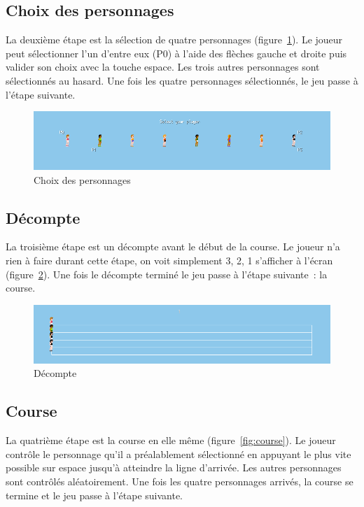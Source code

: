 \documentclass[a4paper]{article}
\begin{document}
\subsection{Choix des personnages}

La deuxième étape est la sélection de quatre personnages (figure~\ref{fig:selection}).
Le joueur peut sélectionner l'un d'entre eux (P0) à l'aide des flèches gauche et droite puis valider son choix avec la touche espace.
Les trois autres personnages sont sélectionnés au hasard.
Une fois les quatre personnages sélectionnés, le jeu passe à l'étape suivante.

\begin{figure}[htbp]
  \centering
  \includegraphics[width=400pt]{selection.png}
  \caption{Choix des personnages}\label{fig:selection}
\end{figure}

\subsection{Décompte}

La troisième étape est un décompte avant le début de la course.
Le joueur n'a rien à faire durant cette étape, on voit simplement 3, 2, 1 s'afficher à l'écran (figure~\ref{fig:decompte}).
Une fois le décompte terminé le jeu passe à l'étape suivante~: la course.

\begin{figure}[htbp]
  \centering
  \includegraphics[width=400pt]{decompte.png}
  \caption{Décompte}\label{fig:decompte}
\end{figure}

\subsection{Course}

La quatrième étape est la course en elle même (figure~\ref{fig:course}).
Le joueur contrôle le personnage qu'il a préalablement sélectionné en appuyant le plus vite possible sur espace jusqu'à atteindre la ligne d'arrivée.
Les autres personnages sont contrôlés aléatoirement.
Une fois les quatre personnages arrivés, la course se termine et le jeu passe à l'étape suivante.
\end{document}
